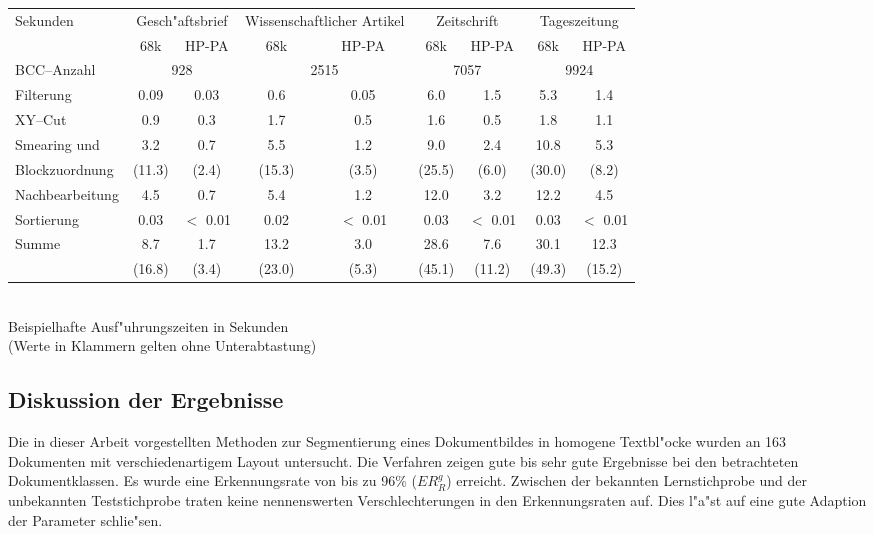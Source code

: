 \begin{center}\small
\begin{tabular}{|p{3cm}|c|c|c|c|c|c|c|c|}
\hline
Sekunden &\multicolumn{2}{p{25mm}|}{Gesch"aftsbrief}&\multicolumn{2}{p{25mm}|}{Wissenschaft\-licher Artikel}&
    \multicolumn{2}{p{25mm}|}{Zeitschrift}&\multicolumn{2}{p{25mm}|}{Tageszeitung}\\
    & 68k & HP-PA & 68k & HP-PA & 68k & HP-PA & 68k & HP-PA\\
\hline
BCC--Anzahl &\multicolumn{2}{c|}{928}&\multicolumn{2}{c|}{2515}&
\multicolumn{2}{c|}{7057}&\multicolumn{2}{c|}{9924}\\
\hline
Filterung & 0.09 & 0.03 & 0.6 & 0.05 & 6.0 & 1.5 & 5.3 & 1.4\\
\hline
XY--Cut   & 0.9 & 0.3 & 1.7 & 0.5 & 1.6 & 0.5 & 1.8 & 1.1\\
\hline
Smearing und& 3.2 & 0.7 & 5.5 & 1.2 & 9.0 & 2.4 & 10.8 & 5.3\\
Blockzuordnung& (11.3)& (2.4) & (15.3) & (3.5) & (25.5) & (6.0) & (30.0) & (8.2) \\
\hline
Nachbearbeitung & 4.5 & 0.7 & 5.4 & 1.2 & 12.0 & 3.2 & 12.2 & 4.5\\
\hline
Sortierung & 0.03 & $<$ 0.01&0.02 & $<$ 0.01& 0.03 & $<$ 0.01& 0.03 & $<$ 0.01\\
\hline\hline
Summe & 8.7 &1.7& 13.2 & 3.0& 28.6 & 7.6& 30.1 & 12.3\\
 & (16.8) & (3.4) & (23.0) & (5.3) & (45.1) & (11.2) & (49.3) & (15.2)\\
\hline
\end{tabular}\\[3mm]
Beispielhafte Ausf"uhrungszeiten in Sekunden\\(Werte in Klammern gelten ohne Unterabtastung)
\end{center}

\subsection{Diskussion der Ergebnisse}\label{ErgDiskuss}

Die in dieser Arbeit vorgestellten Methoden zur Segmentierung eines Dokumentbildes in
homogene Textbl"ocke wurden an 163 Dokumenten mit verschiedenartigem Layout
untersucht. Die Verfahren zeigen gute bis sehr gute Ergebnisse bei den betrachteten
Dokumentklassen. Es wurde eine Erkennungsrate von bis zu 96\% ($ER_{R}^{g}$) erreicht. 
Zwischen der bekannten Lernstichprobe und der unbekannten Teststichprobe traten keine
nennenswerten Verschlechterungen in den Erkennungsraten auf. Dies l"a"st auf eine
gute Adaption der Parameter schlie"sen.

